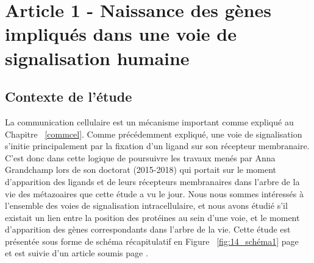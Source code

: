 \chapter{Article 1 - Naissance des gènes impliqués dans une voie de signalisation humaine}
\thispagestyle{firstpage}
\onehalfspacing

\section{Contexte de l'étude}
\par La communication cellulaire est un mécanisme important comme expliqué au Chapitre ~\ref{commcel}. Comme précédemment expliqué, une voie de signalisation s’initie principalement par la fixation d’un ligand sur son récepteur membranaire. C’est donc dans cette logique de poursuivre les travaux menés par Anna Grandchamp lors de son doctorat (2015-2018) qui portait sur le moment d’apparition des ligands et de leurs récepteurs membranaires dans l’arbre de la vie des métazoaires que cette étude a vu le jour. Nous nous sommes intéressés à l’ensemble des voies de signalisation intracellulaire, et nous avons étudié s’il existait un lien entre la position des protéines au sein d’une voie, et le moment d’apparition des gènes correspondants dans l’arbre de la vie. Cette étude est présentée sous forme de schéma récapitulatif en Figure ~\ref{fig:14_schéma1} page ~\pageref{fig:14_schéma1} et est suivie d’un article soumis page \pageref{art1}.

